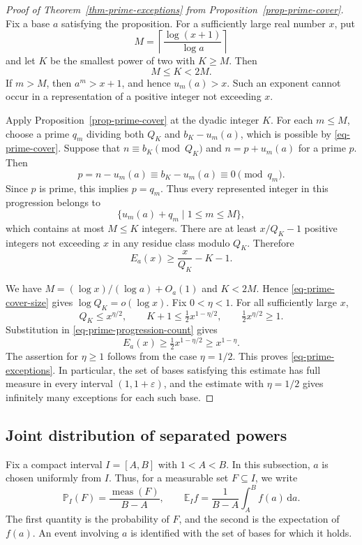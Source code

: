 \documentclass[11pt,reqno]{amsart}
\numberwithin{equation}{section}
\begin{document}
\begin{proof}[Proof of Theorem~\ref{thm-prime-exceptions} from Proposition~\ref{prop-prime-cover}]
Fix a base $a$ satisfying the proposition. For a sufficiently large real number $x$, put
\[
 M=\left\lceil\frac{\log(x+1)}{\log a}\right\rceil
\]
and let $K$ be the smallest power of two with $K\ge M$. Then
\[
 M\le K<2M.
\]
If $m>M$, then $a^m>x+1$, and hence $u_m(a)>x$. Such an exponent cannot occur in a representation of a positive integer not exceeding $x$.

Apply Proposition~\ref{prop-prime-cover} at the dyadic integer $K$. For each $m\le M$, choose a prime $q_m$ dividing both $Q_K$ and $b_K-u_m(a)$, which is possible by \eqref{eq-prime-cover}. Suppose that $n\equiv b_K\pmod{Q_K}$ and $n=p+u_m(a)$ for a prime $p$. Then
\[
 p=n-u_m(a)\equiv b_K-u_m(a)\equiv0\pmod{q_m}.
\]
Since $p$ is prime, this implies $p=q_m$. Thus every represented integer in this progression belongs to
\[
 \{u_m(a)+q_m\mid1\le m\le M\},
\]
which contains at most $M\le K$ integers. There are at least $x/Q_K-1$ positive integers not exceeding $x$ in any residue class modulo $Q_K$. Therefore
\begin{equation}\label{eq-prime-progression-count}
 E_a(x)\ge \frac{x}{Q_K}-K-1.
\end{equation}

We have $M=(\log x)/(\log a)+O_a(1)$ and $K<2M$. Hence \eqref{eq-prime-cover-size} gives $\log Q_K=o(\log x)$. Fix $0<\eta<1$. For all sufficiently large $x$,
\[
 Q_K\le x^{\eta/2},\qquad
 K+1\le \tfrac12x^{1-\eta/2},\qquad
 \tfrac12x^{\eta/2}\ge1.
\]
Substitution in \eqref{eq-prime-progression-count} gives
\[
 E_a(x)\ge \tfrac12x^{1-\eta/2}\ge x^{1-\eta}.
\]
The assertion for $\eta\ge1$ follows from the case $\eta=1/2$. This proves \eqref{eq-prime-exceptions}. In particular, the set of bases satisfying this estimate has full measure in every interval $(1,1+\varepsilon)$, and the estimate with $\eta=1/2$ gives infinitely many exceptions for each such base.
\end{proof}

\subsection{Joint distribution of separated powers}

Fix a compact interval $I=[A,B]$ with $1<A<B$. In this subsection, $a$ is chosen uniformly from $I$. Thus, for a measurable set $F\subseteq I$, we write
\[
 \mathbb P_I(F)=\frac{\operatorname{meas}(F)}{B-A},
 \qquad
 \mathbb E_I f=\frac1{B-A}\int_A^B f(a)\,\mathrm{d}a.
\]
The first quantity is the probability of $F$, and the second is the expectation of $f(a)$. An event involving $a$ is identified with the set of bases for which it holds.
\end{document}
